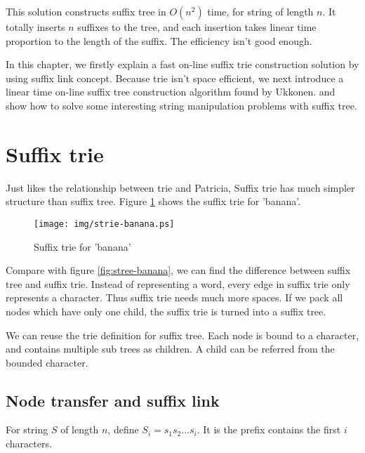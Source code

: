\documentclass{article}
\begin{document}
This solution constructs suffix tree in $O(n^2)$ time, for string of length $n$.
It totally inserts $n$ suffixes to the tree, and each
insertion takes linear time proportion to the length of the suffix.
The efficiency isn't good enough.

In this chapter, we firstly explain a fast on-line suffix trie construction
solution by using suffix link concept. Because trie isn't space efficient,
we next introduce a linear time on-line suffix tree construction algorithm
found by Ukkonen. and show
how to solve some interesting string manipulation problems with
suffix tree.

\section{Suffix trie}
\label{suffix-trie}

Just likes the relationship between trie and Patricia, Suffix trie has much simpler
structure than suffix tree. Figure \ref{fig:strie-banana} shows the suffix trie for
'banana'.

\begin{figure}[htbp]
  \centering
  \texttt{[image: img/strie-banana.ps]}
  \caption{Suffix trie for 'banana'} \label{fig:strie-banana}
\end{figure}

Compare with figure \ref{fig:stree-banana}, we can find the difference between
suffix tree and suffix trie. Instead of representing
a word, every edge in suffix trie only represents a character.
Thus suffix trie needs much more spaces.
If we pack all nodes which have only one child, the suffix
trie is turned into a suffix tree.

We can reuse the trie definition for suffix tree. Each node is bound to a
character, and contains multiple sub trees as children. A child can be
referred from the bounded character.

\subsection{Node transfer and suffix link}

For string $S$ of length $n$, define $S_i=s_1s_2...s_i$.
It is the prefix contains the first $i$ characters.
\end{document}
